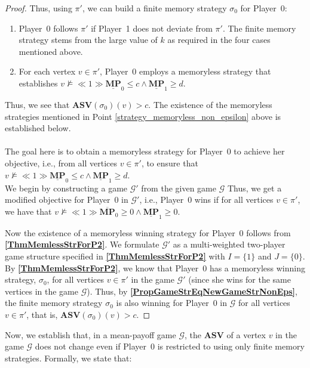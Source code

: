 \begin{proof}
Thus, using $\pi'$, we can build a finite memory strategy $\sigma_0$ for Player~0:
\begin{enumerate}
    \item Player~0 follows $\pi'$ if Player~1 does not deviate from $\pi'$. The finite memory strategy stems from the large value of $k$ as required in the four cases mentioned above.
    \item \label{strategy_memoryless_non_epsilon} For each vertex $v \in \pi'$, Player~0 employs a memoryless strategy that establishes $v \nvDash \ll 1 \gg \underline{\mathbf{MP}}_0 \leqslant c \land \underline{\mathbf{MP}}_1 \geqslant d$.
\end{enumerate}
Thus, we see that $\mathbf{ASV}(\sigma_0)(v) > c$.
The existence of the memoryless strategies mentioned in Point \ref{strategy_memoryless_non_epsilon} above is established below. \\ \\
\noindent The goal here is to obtain a memoryless strategy for Player~0 to achieve her objective, i.e., from all vertices $v \in \pi'$, to ensure that $v \nvDash \ll 1 \gg \underline{\mathbf{MP}}_0 \leqslant c \land \underline{\mathbf{MP}}_1 \geqslant d$. \\
\noindent We begin by constructing a game $\mathcal{G'}$ from the given game $\mathcal{G}$ Thus, we get a modified objective for Player~0 in $\mathcal{G'}$, i.e., Player~0 wins if for all vertices $v \in \pi'$, we have that $v \nvDash \ll 1 \gg \overline{\mathbf{MP}}_0 \geqslant 0 \land \underline{\mathbf{MP}}_1 \geqslant 0$.

Now the existence of a memoryless winning strategy for Player~0 follows from \textbf{\cref{ThmMemlessStrForP2}}. We formulate $\mathcal{G'}$ as a multi-weighted two-player game structure specified in \textbf{\cref{ThmMemlessStrForP2}} with $I = \{1\}$ and $J = \{0\}$. By \textbf{\cref{ThmMemlessStrForP2}}, we know that Player~0 has a memoryless winning strategy, $\sigma_0$,  for all vertices $v \in \pi'$ in the game $\mathcal{G'}$ (since she wins for the same vertices in the game $\mathcal{G}$). Thus, by \textbf{\cref{PropGameStrEqNewGameStrNonEps}}, the finite memory strategy $\sigma_0$ is also winning for Player~0 in $\mathcal{G}$ for all vertices $v \in \pi'$, that is, $\mathbf{ASV}(\sigma_0)(v) > c$.
\end{proof}

Now, we establish that, in a mean-payoff game $\mathcal{G}$, the $\mathbf{ASV}$ of a vertex $v$ in the game $\mathcal{G}$ does not change even if Player~0 is restricted to using only finite memory strategies. Formally, we state that:

